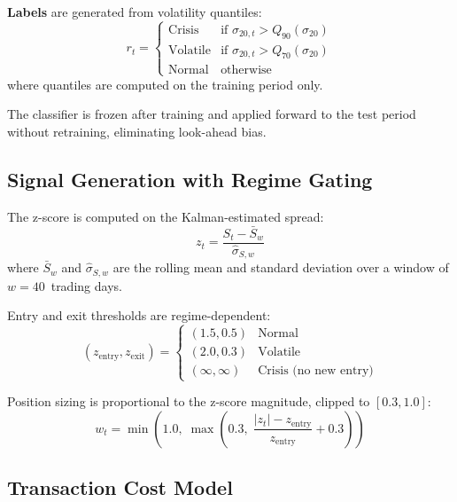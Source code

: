 \documentclass{ieeeaccess}
\begin{document}
\textbf{Labels} are generated from volatility quantiles:
\begin{equation}
    r_t = \begin{cases}
        \text{Crisis} & \text{if } \sigma_{20,t} > Q_{90}(\sigma_{20}) \\
        \text{Volatile} & \text{if } \sigma_{20,t} > Q_{70}(\sigma_{20}) \\
        \text{Normal} & \text{otherwise}
    \end{cases}
\end{equation}
where quantiles are computed on the training period only.

The classifier is frozen after training and applied forward to the test period without retraining, eliminating look-ahead bias.

\subsection{Signal Generation with Regime Gating}

The z-score is computed on the Kalman-estimated spread:
\begin{equation}
    z_t = \frac{S_t - \bar{S}_w}{\hat{\sigma}_{S,w}}
    \label{eq:zscore}
\end{equation}
where $\bar{S}_w$ and $\hat{\sigma}_{S,w}$ are the rolling mean and standard deviation over a window of $w = 40$~trading days.

Entry and exit thresholds are regime-dependent:
\begin{equation}
    (z_{\text{entry}}, z_{\text{exit}}) = \begin{cases}
        (1.5, 0.5) & \text{Normal} \\
        (2.0, 0.3) & \text{Volatile} \\
        (\infty, \infty) & \text{Crisis (no new entry)}
    \end{cases}
    \label{eq:thresholds}
\end{equation}

Position sizing is proportional to the z-score magnitude, clipped to $[0.3, 1.0]$:
\begin{equation}
    w_t = \min\!\left(1.0,\; \max\!\left(0.3,\; \frac{|z_t| - z_{\text{entry}}}{z_{\text{entry}}} + 0.3\right)\right)
    \label{eq:sizing}
\end{equation}

\subsection{Transaction Cost Model}
\end{document}
